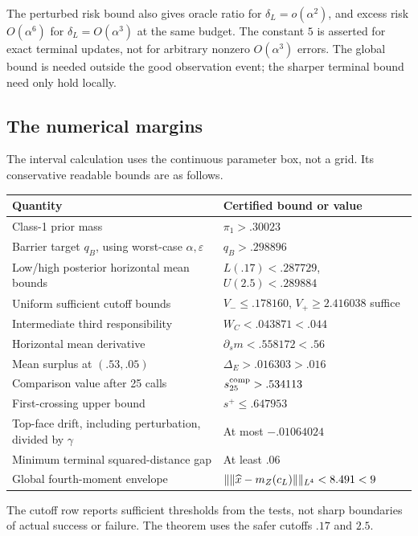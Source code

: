 The perturbed risk bound also gives oracle ratio for $\delta_L=o(\alpha^2)$,
and excess risk $O(\alpha^6)$ for $\delta_L=O(\alpha^3)$ at the same budget.
The constant $5$ is asserted for exact terminal updates, not for arbitrary
nonzero $O(\alpha^3)$ errors. The global bound is needed outside the good
observation event; the sharper terminal bound need only hold locally.

\subsection{The numerical margins}
The interval calculation uses the continuous parameter box, not a grid.
Its conservative readable bounds are as follows.
\begin{center}\small
\begin{tabular}{@{}p{.48\linewidth}p{.43\linewidth}@{}}\toprule
Quantity & Certified bound or value \\\midrule
Class-1 prior mass & $\pi_1>.30023$ \\
Barrier target $q_B$, using worst-case $\alpha,\varepsilon$ & $q_B>.298896$ \\
Low/high posterior horizontal mean bounds & $L(.17)<.287729$, $U(2.5)<.289884$ \\
Uniform sufficient cutoff bounds & $V_-\le.178160$, $V_+\ge2.416038$ suffice \\
Intermediate third responsibility & $W_C<.043871<.044$ \\
Horizontal mean derivative & $\partial_s m<.558172<.56$ \\
Mean surplus at $(.53,.05)$ & $\Delta_E>.016303>.016$ \\
Comparison value after 25 calls & $s_{25}^{\rm comp}>.534113$ \\
First-crossing upper bound & $s^+\le.647953$ \\
Top-face drift, including perturbation, divided by $\gamma$ & At most $-.01064024$ \\
Minimum terminal squared-distance gap & At least $.06$ \\
Global fourth-moment envelope & $\|\lVert\widehat x-m_Z(c_L)\rVert\|_{L^4}<8.491<9$ \\
\bottomrule\end{tabular}
\end{center}
The cutoff row reports sufficient thresholds from the tests, not sharp
boundaries of actual success or failure. The theorem uses the safer cutoffs
$.17$ and $2.5$.


